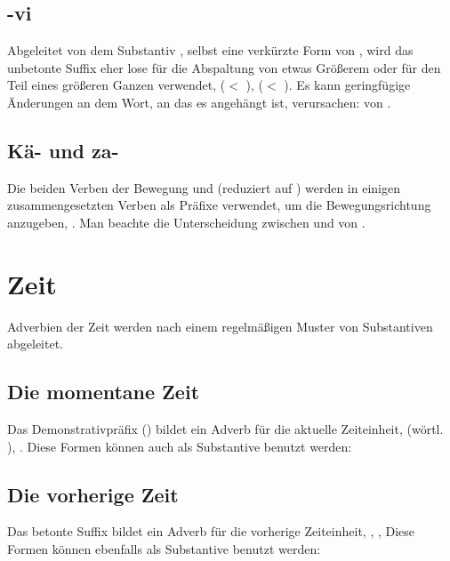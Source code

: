 \subsection{-vi} Abgeleitet von dem Substantiv , selbst eine verkürzte Form von  , wird das unbetonte Suffix  eher lose für die Abspaltung von etwas Größerem oder für den Teil eines größeren Ganzen verwendet,   ($<$  ),   ($<$  ). Es kann geringfügige Änderungen an dem Wort, an das es angehängt ist, verursachen:   von  .

\subsection{Kä- und za-} Die beiden Verben der Bewegung   und   (reduziert auf ) werden in einigen zusammengesetzten Verben als Präfixe verwendet, um die Bewegungsrichtung anzugeben,  . Man beachte die Unterscheidung zwischen   und   von  .

\section{Zeit}
\noindent Adverbien der Zeit werden nach einem regelmäßigen Muster von Substantiven abgeleitet.\\

\subsection{Die momentane Zeit} Das Demonstrativpräfix  () bildet ein Adverb für die aktuelle Zeiteinheit,   (wörtl. ),  . Diese Formen können auch als Substantive benutzt werden:  

\subsection{Die vorherige Zeit} Das betonte Suffix  bildet ein Adverb für die vorherige Zeiteinheit,  ,  ,   Diese Formen können ebenfalls als Substantive benutzt werden: 

